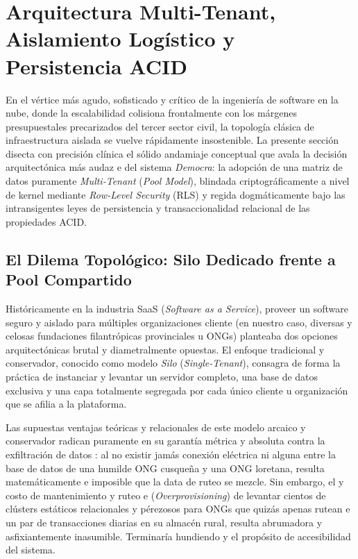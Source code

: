 \section{Arquitectura Multi-Tenant, Aislamiento Logístico y Persistencia ACID}

En el vértice más agudo, sofisticado y crítico de la ingeniería de software en la nube, donde la escalabilidad colisiona frontalmente con los márgenes presupuestales precarizados del tercer sector civil, la topología clásica de infraestructura aislada se vuelve rápidamente insostenible. La presente sección disecta con precisión clínica el sólido andamiaje conceptual que avala la decisión arquitectónica más audaz e del sistema \textit{Democra}: la adopción de una matriz de datos puramente \textit{Multi-Tenant} (\textit{Pool Model}), blindada criptográficamente a nivel de kernel mediante \textit{Row-Level Security} (RLS) y regida dogmáticamente bajo las intransigentes leyes de persistencia y transaccionalidad relacional de las propiedades ACID. 

\subsection{El Dilema Topológico: Silo Dedicado frente a Pool Compartido}

Históricamente en la industria SaaS (\textit{Software as a Service}), proveer un software seguro y aislado para múltiples organizaciones cliente (en nuestro caso, diversas y celosas fundaciones filantrópicas provinciales u ONGs) planteaba dos opciones arquitectónicas brutal y diametralmente opuestas. El enfoque tradicional y conservador, conocido como modelo \textit{Silo} (\textit{Single-Tenant}), consagra de forma la práctica de instanciar y levantar un servidor completo, una base de datos exclusiva y una capa totalmente segregada por cada único cliente u organización que se afilia a la plataforma. 

Las supuestas ventajas teóricas y relacionales de este modelo arcaico y conservador radican puramente en su garantía métrica y absoluta contra la exfiltración de datos : al no existir jamás conexión eléctrica ni alguna entre la base de datos de una humilde ONG cusqueña y una ONG loretana, resulta matemáticamente e imposible que la data de ruteo se mezcle. Sin embargo, el y costo de mantenimiento y ruteo e (\textit{Overprovisioning}) de levantar cientos de clústers estáticos relacionales y pérezosos para ONGs que quizás apenas rutean e un par de transacciones diarias en su almacén rural, resulta abrumadora y asfixiantemente inasumible. Terminaría hundiendo y el propósito de accesibilidad del sistema.

